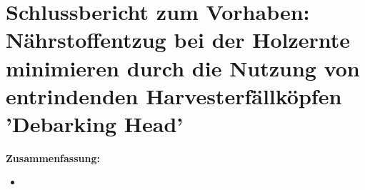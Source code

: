 \documentclass{article}
\begin{document}
\section*{Schlussbericht zum Vorhaben: Nährstoffentzug  bei  der  Holzernte  minimieren durch die Nutzung von entrindenden Harvesterfällköpfen 'Debarking Head'}

\textbf{Zusammenfassung:}\\

\begin{itemize}
	
	\item
	
	
	
\end{itemize} 


\end{document}

